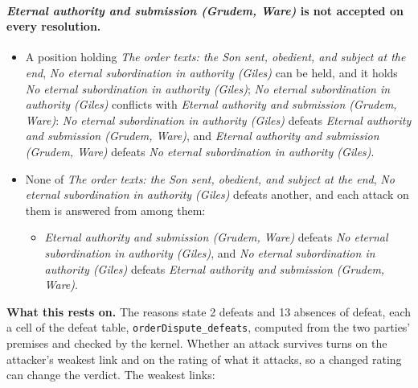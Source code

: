 \documentclass[11pt,paper=\testimonypaper,DIV=13,parskip=false]{scrartcl}
\begin{document}
\paragraph{\emph{Eternal authority and submission (Grudem, Ware)} is not accepted on every resolution.}
\begin{itemize}
\item A position holding \emph{The order texts: the Son sent, obedient, and subject at the end}, \emph{No eternal subordination in authority (Giles)} can be held, and it holds \emph{No eternal subordination in authority (Giles)}; \emph{No eternal subordination in authority (Giles)} conflicts with \emph{Eternal authority and submission (Grudem, Ware)}: \emph{No eternal subordination in authority (Giles)} defeats \emph{Eternal authority and submission (Grudem, Ware)}, and \emph{Eternal authority and submission (Grudem, Ware)} defeats \emph{No eternal subordination in authority (Giles)}.
\item None of \emph{The order texts: the Son sent, obedient, and subject at the end}, \emph{No eternal subordination in authority (Giles)} defeats another, and each attack on them is answered from among them:
\begin{itemize}
\item \emph{Eternal authority and submission (Grudem, Ware)} defeats \emph{No eternal subordination in authority (Giles)}, and \emph{No eternal subordination in authority (Giles)} defeats \emph{Eternal authority and submission (Grudem, Ware)}.
\end{itemize}
\end{itemize}
\par\noindent\textbf{What this rests on.} The reasons state 2 defeats and 13 absences of defeat, each a cell of the defeat table, \texttt{order\allowbreak{}Dispute\_\allowbreak{}defeats}, computed from the two parties' premises and checked by the kernel. Whether an attack survives turns on the attacker's weakest link and on the rating of what it attacks, so a changed rating can change the verdict. The weakest links:
\end{document}
